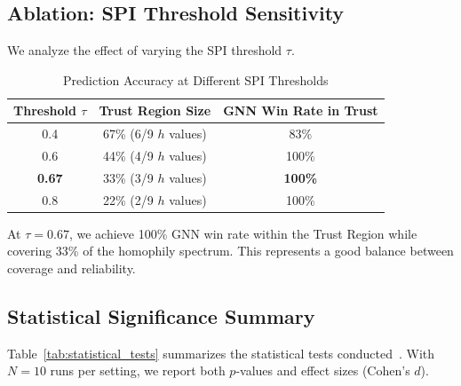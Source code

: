 \subsection{Ablation: SPI Threshold Sensitivity}

We analyze the effect of varying the SPI threshold $\tau$.

\begin{table}[t]
\centering
\caption{Prediction Accuracy at Different SPI Thresholds}
\label{tab:threshold}
\begin{tabular}{@{}ccc@{}}
\toprule
Threshold $\tau$ & Trust Region Size & GNN Win Rate in Trust \\
\midrule
0.4 & 67\% (6/9 $h$ values) & 83\% \\
0.6 & 44\% (4/9 $h$ values) & 100\% \\
\textbf{0.67} & 33\% (3/9 $h$ values) & \textbf{100\%} \\
0.8 & 22\% (2/9 $h$ values) & 100\% \\
\bottomrule
\end{tabular}
\end{table}

At $\tau = 0.67$, we achieve 100\% GNN win rate within the Trust Region while covering 33\% of the homophily spectrum. This represents a good balance between coverage and reliability.

\subsection{Statistical Significance Summary}

Table~\ref{tab:statistical_tests} summarizes the statistical tests conducted~\cite{demsar2006statistical}. With $N=10$ runs per setting, we report both $p$-values and effect sizes (Cohen's $d$).

